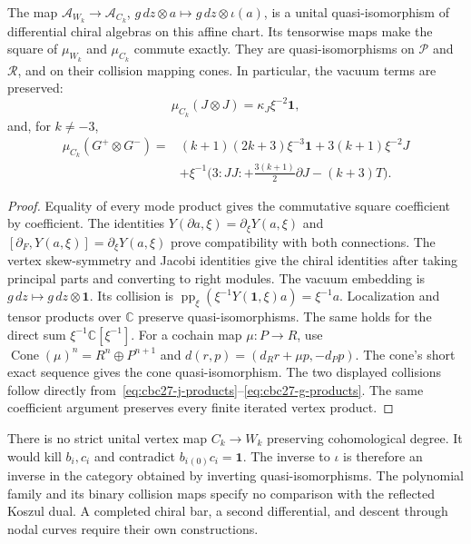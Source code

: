 \begin{proposition}\label{prop:cbc27-binary}
The map $\mathcal A_{W_k}\to\mathcal A_{C_k}$, $g\,dz\otimes a\mapsto g\,dz\otimes\iota(a)$,
is a unital quasi-isomorphism of differential chiral algebras on this affine chart.
Its tensorwise maps make the square of $\mu_{W_k}$ and $\mu_{C_k}$ commute exactly.
They are quasi-isomorphisms on $\mathcal P$ and $\mathcal R$, and on their collision mapping cones.
In particular, the vacuum terms are preserved:
\[
 \mu_{C_k}(J\otimes J)=\kappa_J\xi^{-2}\mathbf1,
\]
and, for $k\ne-3$,
\[
 \begin{split}
 \mu_{C_k}(G^+\otimes G^-)
 ={}&(k+1)(2k+3)\xi^{-3}\mathbf1
 +3(k+1)\xi^{-2}J\\
 &+\xi^{-1}\bigl(3:JJ:+\tfrac{3(k+1)}2\partial J-(k+3)T\bigr).
 \end{split}
\]
\end{proposition}
\begin{proof}
Equality of every mode product gives the commutative square coefficient by coefficient.
The identities $Y(\partial a,\xi)=\partial_\xi Y(a,\xi)$ and
$[\partial_F,Y(a,\xi)]=\partial_\xi Y(a,\xi)$ prove compatibility with both connections.
The vertex skew-symmetry and Jacobi identities give the chiral identities after taking principal parts and converting to right modules.
The vacuum embedding is $g\,dz\mapsto g\,dz\otimes\mathbf1$.
Its collision is $\operatorname{pp}_{\xi}(\xi^{-1}Y(\mathbf1,\xi)a)=\xi^{-1}a$.
Localization and tensor products over $\mathbb C$ preserve quasi-isomorphisms.
The same holds for the direct sum $\xi^{-1}\mathbb C[\xi^{-1}]$.
For a cochain map $\mu:P\to R$, use
$\operatorname{Cone}(\mu)^n=R^n\oplus P^{n+1}$ and
$d(r,p)=(d_Rr+\mu p,-d_Pp)$.
The cone's short exact sequence gives the cone quasi-isomorphism.
The two displayed collisions follow directly from~\eqref{eq:cbc27-j-products}--\eqref{eq:cbc27-g-products}.
The same coefficient argument preserves every finite iterated vertex product.
\end{proof}

There is no strict unital vertex map $C_k\to W_k$ preserving cohomological degree.
It would kill $b_i,c_i$ and contradict $b_i{}_{(0)}c_i=\mathbf1$.
The inverse to $\iota$ is therefore an inverse in the category obtained by inverting quasi-isomorphisms.
The polynomial family and its binary collision maps specify no comparison with the reflected Koszul dual.
A completed chiral bar, a second differential, and descent through nodal curves require their own constructions.
